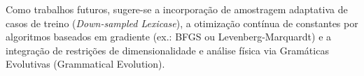 Como trabalhos futuros, sugere-se a incorporação de amostragem adaptativa
de casos de treino (\emph{Down-sampled Lexicase}), a otimização contínua de
constantes por algoritmos baseados em gradiente (ex.: BFGS ou Levenberg-Marquardt)
e a integração de restrições de dimensionalidade e análise física via Gramáticas
Evolutivas (Grammatical Evolution).
